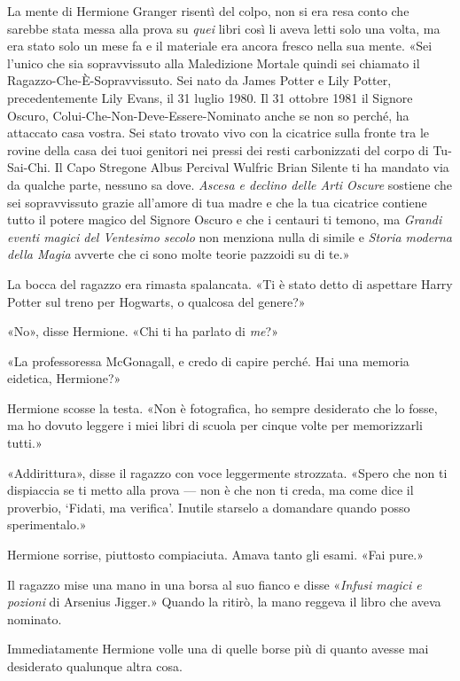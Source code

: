La mente di Hermione Granger risentì del colpo, non si era resa conto che sarebbe stata messa alla prova su \textit{quei} libri così li aveva letti solo una volta, ma era stato solo un mese fa e il materiale era ancora fresco nella sua mente. «Sei l’unico che sia sopravvissuto alla Maledizione Mortale quindi sei chiamato il Ragazzo-Che-È-Sopravvissuto. Sei nato da James Potter e Lily Potter, precedentemente Lily Evans, il 31 luglio 1980. Il 31 ottobre 1981 il Signore Oscuro, Colui-Che-Non-Deve-Essere-Nominato anche se non so perché, ha attaccato casa vostra. Sei stato trovato vivo con la cicatrice sulla fronte tra le rovine della casa dei tuoi genitori nei pressi dei resti carbonizzati del corpo di Tu-Sai-Chi. Il Capo Stregone Albus Percival Wulfric Brian Silente ti ha mandato via da qualche parte, nessuno sa dove. \textit{Ascesa e declino delle Arti Oscure} sostiene che sei sopravvissuto grazie all’amore di tua madre e che la tua cicatrice contiene tutto il potere magico del Signore Oscuro e che i centauri ti temono, ma \textit{Grandi eventi magici del Ventesimo secolo} non menziona nulla di simile e \textit{Storia moderna della Magia} avverte che ci sono molte teorie pazzoidi su di te.»

La bocca del ragazzo era rimasta spalancata. «Ti è stato detto di aspettare Harry Potter sul treno per Hogwarts, o qualcosa del genere?»

«No», disse Hermione. «Chi ti ha parlato di \textit{me}?»

«La professoressa McGonagall, e credo di capire perché. Hai una memoria eidetica, Hermione?»

Hermione scosse la testa. «Non è fotografica, ho sempre desiderato che lo fosse, ma ho dovuto leggere i miei libri di scuola per cinque volte per memorizzarli tutti.»

«Addirittura», disse il ragazzo con voce leggermente strozzata. «Spero che non ti dispiaccia se ti metto alla prova — non è che non ti creda, ma come dice il proverbio, ‘Fidati, ma verifica’. Inutile starselo a domandare quando posso sperimentalo.»

Hermione sorrise, piuttosto compiaciuta. Amava tanto gli esami. «Fai pure.»

Il ragazzo mise una mano in una borsa al suo fianco e disse «\textit{Infusi magici e pozioni} di Arsenius Jigger.» Quando la ritirò, la mano reggeva il libro che aveva nominato.

Immediatamente Hermione volle una di quelle borse più di quanto avesse mai desiderato qualunque altra cosa.

